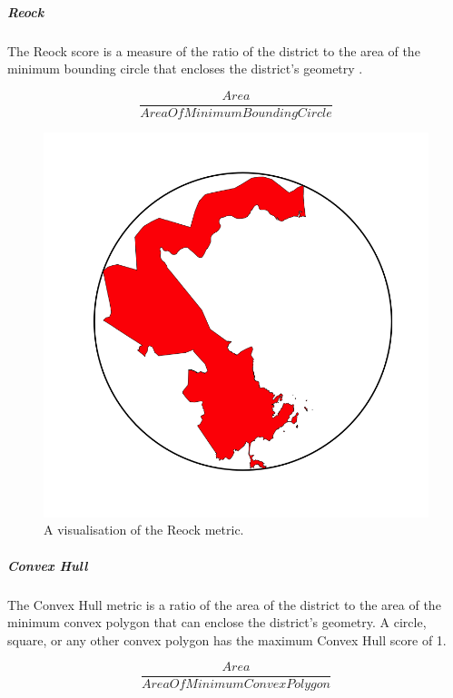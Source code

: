 \documentclass[]{article}
\let\oldsubparagraph\subparagraph
\renewcommand{\subparagraph}[1]{\oldsubparagraph{#1}\mbox{}}
\begin{document}
\hypertarget{reock}{%
\subparagraph{Reock}\label{reock}}

The Reock score is a measure of the ratio of the district to the area of
the minimum bounding circle that encloses the district's geometry
\citep{reock1961}.

\[\frac{Area}{AreaOfMinimumBoundingCircle}\]

\begin{figure}
\centering
\includegraphics{img/reock.png}
\caption{A visualisation of the Reock metric.}
\end{figure}

\hypertarget{convex-hull}{%
\subparagraph{Convex Hull}\label{convex-hull}}

The Convex Hull metric is a ratio of the area of the district to the
area of the minimum convex polygon that can enclose the district's
geometry. A circle, square, or any other convex polygon has the maximum
Convex Hull score of 1.

\[\frac{Area}{AreaOfMinimumConvexPolygon}\]
\end{document}
